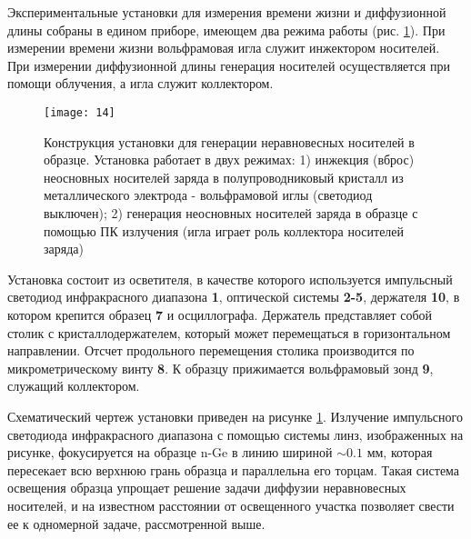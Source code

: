 \documentclass[a4paper,12pt]{article}
\begin{document}
Экспериментальные установки для измерения времени жизни и диффузионной длины собраны в едином приборе, имеющем два режима работы (рис.  \ref{fig:figure13}). При измерении времени жизни вольфрамовая игла служит инжектором носителей. При измерении диффузионной длины генерация носителей осуществляется при помощи облучения, а игла служит коллектором.
\begin{figure}[H]
	\centering
	\texttt{[image: 14]}
	\caption{Конструкция установки для генерации неравновесных носителей в образце. Установка работает в двух режимах: 1) инжекция (вброс) неосновных носителей заряда в полупроводниковый кристалл из металлического электрода - вольфрамовой иглы (светодиод выключен); 2) генерация неосновных носителей заряда в образце с помощью ПК излучения (игла играет роль коллектора носителей заряда)
}
	\label{fig:figure13}
\end{figure}


Установка состоит из осветителя, в качестве которого используется импульсный светодиод инфракрасного диапазона \textbf{1}, оптической системы \textbf{2-5}, держателя \textbf{10}, в котором крепится образец \textbf{7} и осциллографа. Держатель представляет собой столик с кристаллодержателем, который может перемещаться в горизонтальном направлении. Отсчет продольного перемещения столика производится по микрометрическому винту \textbf{8}. К образцу прижимается вольфрамовый зонд \textbf{9}, служащий коллектором.

Схематический чертеж установки приведен на рисунке \ref{fig:figure13}. Излучение импульсного светодиода инфракрасного диапазона с помощью системы линз, изображенных на рисунке, фокусируется на образце n-Ge в линию шириной $\sim0.1$ мм, которая пересекает всю верхнюю грань образца и параллельна его торцам. Такая система освещения образца упрощает решение задачи диффузии неравновесных носителей, и на известном расстоянии от освещенного участка позволяет свести ее к одномерной задаче, рассмотренной выше.

\end{document}
